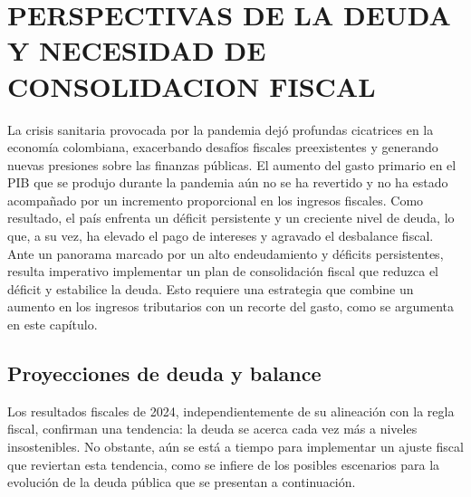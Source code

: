 \chapter{PERSPECTIVAS DE LA DEUDA Y NECESIDAD DE CONSOLIDACION FISCAL}\label{chap:perspectivas}

La crisis sanitaria provocada por la pandemia dejó profundas cicatrices en la economía colombiana, exacerbando desafíos fiscales preexistentes y generando nuevas presiones sobre las finanzas públicas. El aumento del gasto primario en el PIB que se produjo durante la pandemia aún no se ha revertido y no ha estado acompañado por un incremento proporcional en los ingresos fiscales. Como resultado, el país enfrenta un déficit persistente y un creciente nivel de deuda, lo que, a su vez, ha elevado el pago de intereses y agravado el desbalance fiscal. Ante un panorama marcado por un alto endeudamiento y déficits persistentes, resulta imperativo implementar un plan de consolidación fiscal que reduzca el déficit y estabilice la deuda. Esto requiere una estrategia que combine un aumento en los ingresos tributarios con un recorte del gasto, como se argumenta en este capítulo. 

\section{Proyecciones de deuda y balance}

Los resultados fiscales de 2024, independientemente de su alineación con la regla fiscal, confirman una tendencia: la deuda se acerca cada vez más a niveles insostenibles. No obstante, aún se está a tiempo para implementar un ajuste fiscal que reviertan esta tendencia, como se infiere de los posibles escenarios para la evolución de la deuda pública que se presentan a continuación.






